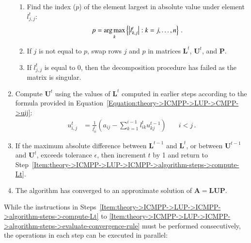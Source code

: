 \begin{enumerate}
		\begin{enumerate}
			\item \label{Item:theory->ICMPP->LUP->ICMPP->algorithm-steps->pivot-row->argmax}
				Find the index ($p$) of the element largest in absolute value under element $l^{t}_{j, j}$:
				\begin{equation}
					p = \operatorname*{arg\,max}_k \left\{ \left| l^{t}_{k, j} \right|: k=j,\dots, n \right\} \nonumber\,.
				\end{equation}
			\item \label{Item:theory->ICMPP->LUP->ICMPP->algorithm-steps->pivot-row->swap-rows}
				If $j$ is not equal to $p$, swap rows $j$ and $p$ in matrices $\mathbf{L}^{t}$, $\mathbf{U}^{t}$, and $\mathbf{P}$.
			\item \label{Item:theory->ICMPP->LUP->ICMPP->algorithm-steps->pivot-row->singular-matrix-check}
				If $l^{t}_{j,j}$ is equal to 0, then the decomposition procedure has failed as the matrix is singular.
		\end{enumerate}
	\item \label{Item:theory->ICMPP->LUP->ICMPP->algorithm-steps->compute-Ut}
		Compute $\mathbf{U}^{t}$ using the values of $\mathbf{L}^{t}$ computed in earlier steps according to the formula provided in Equation~\ref{Equation:theory->ICMPP->LUP->CMPP->uij}:
		\begin{align}
			u_{i,j}^{t} &= \frac{1}{l_{ii}^{t}} \left ( a_{ij} - \sum_{k=1}^{i-1}l_{ik}^{t}u_{kj}^{t-1} \right ) &\quad i < j \nonumber\,.
		\end{align}
	\item \label{Item:theory->ICMPP->LUP->ICMPP->algorithm-steps->evaluate-convergence-rule}
		If the maximum absolute difference between $\mathbf{L}^{t-1}$ and $\mathbf{L}^{t}$, or between $\mathbf{U}^{t-1}$ and $\mathbf{U}^{t}$, exceeds tolerance $\epsilon$, then increment $t$ by 1 and return to Step~\ref{Item:theory->ICMPP->LUP->ICMPP->algorithm-steps->compute-Lt}.
	\item The algorithm has converged to an approximate solution of $ \mathbf{A} = \mathbf{LUP} $.
\end{enumerate}

While the instructions in Steps~\ref{Item:theory->ICMPP->LUP->ICMPP->algorithm-steps->compute-Lt} to \ref{Item:theory->ICMPP->LUP->ICMPP->algorithm-steps->evaluate-convergence-rule} must be performed consecutively, the operations in each step can be executed in parallel:

